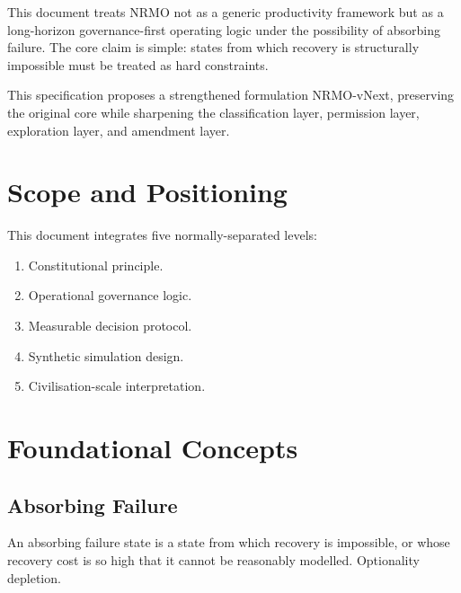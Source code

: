 This document treats NRMO not as a generic productivity framework
but as a long-horizon governance-first operating logic under the
possibility of absorbing failure. The core claim is simple: states
from which recovery is structurally impossible must be treated as
hard constraints.

This specification proposes a strengthened formulation NRMO-vNext,
preserving the original core while sharpening the classification
layer, permission layer, exploration layer, and amendment layer.


\section{Scope and Positioning}
\label{sec:omega-scope}

This document integrates five normally-separated levels:

\begin{enumerate}
\item Constitutional principle.
\item Operational governance logic.
\item Measurable decision protocol.
\item Synthetic simulation design.
\item Civilisation-scale interpretation.
\end{enumerate}

\section{Foundational Concepts}
\label{sec:omega-foundational}

\subsection{Absorbing Failure}
\label{sec:omega-absorbing-failure}

An absorbing failure state is a state from which recovery is
impossible, or whose recovery cost is so high that it cannot be
reasonably modelled. Optionality depletion.

